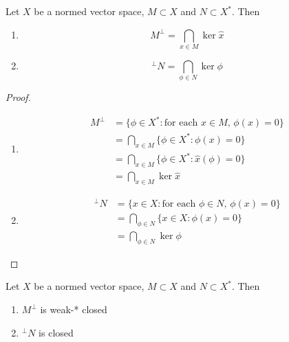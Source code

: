 \documentclass{book}
\begin{document}
	\begin{ex}
	Let $X$ be a normed vector space, $M \subset X$ and $N \subset X^*$. Then 
	\begin{enumerate}
	\item $$M^{\perp} = \bigcap_{x \in M} \ker \hat{x}$$
	\item $$^{\perp}N = \bigcap_{\phi \in N} \ker \phi $$
	\end{enumerate}
	\end{ex}
	
	\begin{proof}\
	\begin{enumerate}
	\item 
	\begin{align*}
	M^{\perp} 
	&= \{\phi \in X^*: \text{for each $x \in M$, $\phi(x) = 0$}\} \\
	&= \bigcap_{x \in M} \{\phi \in X^*: \phi(x) = 0\} \\
	&= \bigcap_{x \in M} \{\phi \in X^*: \hat{x}(\phi) = 0\} \\
	&= \bigcap_{x \in M} \ker \hat{x}
	\end{align*}
	\item 
	\begin{align*}
	^{\perp}N 
	&= \{x \in X: \text{for each $\phi \in N$, $\phi(x) = 0$}\} \\
	&= \bigcap_{\phi \in N} \{x \in X: \phi(x) = 0\} \\
	&= \bigcap_{\phi \in N} \ker \phi
	\end{align*}
	\end{enumerate}
	\end{proof}
	
	\begin{ex}
	Let $X$ be a normed vector space, $M \subset X$ and $N \subset X^*$. Then 
	\begin{enumerate}
	\item $M^{\perp}$ is weak-* closed
	\item $^{\perp} N$ is closed
	\end{enumerate}
	\end{ex}
	
\end{document}

